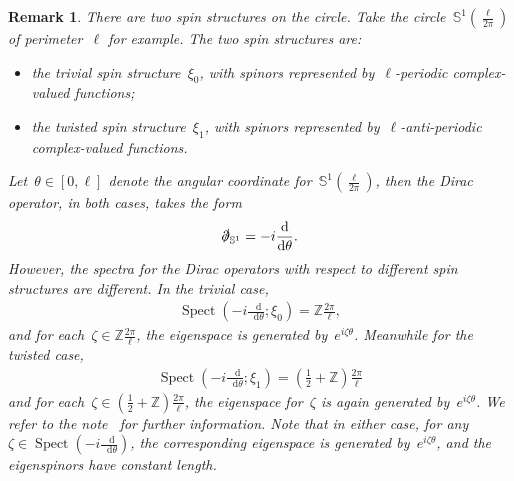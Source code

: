 \documentclass[11pt,final]{amsart}
\newcommand{\pd}{\slashed{\partial}}
\newcommand{\dd}{\mathop{}\!\mathrm{d}}
\newcommand{\sph}{\mathbb{S}}
\newcommand{\bZ}{\mathbb{Z}}
\DeclareMathOperator{\Spect}{Spect}
\newtheorem{rmk}[thm]{Remark}
\begin{document}
\begin{rmk}
    There are two spin structures on the circle.
    Take the circle~$\sph^1(\frac{\ell}{2\pi})$ of perimeter~$\ell$ for example.
    The two spin structures are:
    \begin{itemize}
        \item the trivial spin structure~$\xi_0$, with spinors represented by~$\ell$-periodic complex-valued functions;
        \item the twisted spin structure~$\xi_1$, with spinors represented by~$\ell$-anti-periodic complex-valued functions. 
    \end{itemize}
    Let~$\theta\in [0,\ell]$ denote the angular coordinate for~$\sph^1(\frac{\ell}{2\pi})$, then the Dirac operator, in both cases, takes the form 
    \begin{align}
        \pd_{\sph^1}=-i\frac{\dd}{\dd\theta}.
    \end{align}
    However, the spectra for the Dirac operators with respect to different spin structures are different. 
    In the trivial case,
    \begin{align}
    \Spect(-i\frac{\dd}{\dd \theta};\xi_0)= \bZ \frac{2\pi}{\ell}, 
    \end{align}
    and for each~$\zeta\in\mathbb{Z}\frac{2\pi}{\ell}$, the eigenspace is generated by~$e^{i\zeta\theta}$. 
    Meanwhile for the twisted case, 
    \begin{align}
    \Spect(-i\frac{\dd}{\dd\theta};\xi_1)=(\frac{1}{2}+\mathbb{Z})\frac{2\pi}{\ell}
    \end{align}
    and for each~$\zeta\in(\frac{1}{2}+\mathbb{Z})\frac{2\pi}{\ell}$, the eigenspace for~$\zeta$ is again generated by~$e^{i\zeta\theta}$. 
    We refer to the note~\cite{Varilly2006Dirac} for further information. 
    Note that in either case, for any~$\zeta\in\Spect(-i\frac{\dd}{\dd \theta})$, the corresponding eigenspace is generated by~$e^{i\zeta\theta}$, and the eigenspinors have \emph{constant length}. 
\end{rmk}
\end{document}
